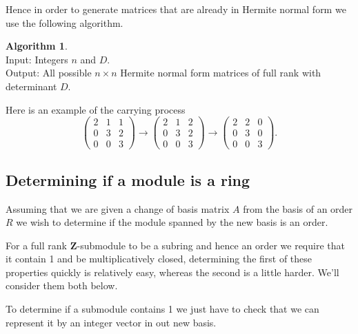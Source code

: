 \documentclass[12pt,a4paper,abstracton,bibtotoc]{scrreprt}
\theoremstyle{definition}
\newtheorem{alg}{Algorithm}
\newcommand{\ZZ}{\mathbf{Z}}
\begin{document}
Hence in order to generate matrices that are already in Hermite normal form we use the following algorithm.

\begin{alg}~\\
Input: Integers $n$ and $D$.\\
Output: All possible $n\times n$ Hermite normal form matrices of full rank with determinant $D$.\\
\begin{algorithm}[H]
\end{algorithm}
\end{alg}

Here is an example of the carrying process
\[
\begin{pmatrix}
2& 1 &1\\
0& 3 &2\\
0& 0 &3
\end{pmatrix}
\to
\begin{pmatrix}
2& 1 &2\\
0& 3 &2\\
0& 0 &3
\end{pmatrix}
\to
\begin{pmatrix}
2& 2 &0\\
0& 3 &0\\
0& 0 &3
\end{pmatrix}.
\]

\subsection{Determining if a module is a ring}
Assuming that we are given a change of basis matrix $A$ from the basis of an order $R$ we wish to determine if the module spanned by the new basis is an order.

For a full rank $\ZZ$-submodule to be a subring and hence an order we require that it contain 1 and be multiplicatively closed, determining the first of these properties quickly is relatively easy, whereas the second is a little harder.
We'll consider them both below.

To determine if a submodule contains 1 we just have to check that we can represent it by an integer vector in out new basis.
\end{document}
